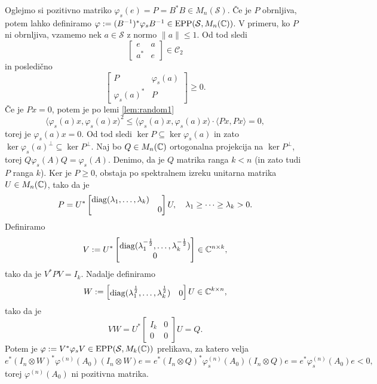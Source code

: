 \begin{dokaz}
    Oglejmo si pozitivno matriko $\varphi_s (e) = P = B^* B \in M_n (\mathcal{S})$. 
    Če je $P$ obrnljiva, potem lahko definiramo $\varphi := (B^{-1})^* \varphi_s B^{-1} \in \operatorname{EPP}(\mathcal{S}, M_n (\mathbb C))$.
    V primeru, ko $P$ ni obrnljiva, vzamemo nek $a \in \mathcal{S}$ z normo $\| a\| \leq 1$.
    Od tod sledi 
    $$\begin{bmatrix}
        e & a\\
        a ^* & e
    \end{bmatrix} \in \mathcal{C}_2$$
    in posledično 
    $$\begin{bmatrix}
        P & \varphi_s (a)\\
        \varphi_s (a) ^* & P
    \end{bmatrix}\geq 0.$$
    Če je $P x = 0$, potem je po lemi \ref{lem:random1} 
    $$\langle \varphi_s (a) x, \varphi_s (a) x \rangle ^2 \leq \langle \varphi_s (a) x, \varphi_s (a) x \rangle \cdot \langle P x, P x \rangle = 0,$$
    torej je $\varphi_s (a) x = 0$. Od tod sledi $ \ker P \subseteq \ker \varphi_s (a)$ in zato $ \ker \varphi_s (a) ^\perp \subseteq\ker P^\perp$.
    Naj bo $Q \in M_n (\mathbb C)$ ortogonalna projekcija na $\ker P^\perp$, torej $Q \varphi_s (A) Q = \varphi_s (A)$.
    Denimo, da je $Q$ matrika ranga $k < n$ (in zato tudi $P$ ranga $k$). Ker je $P \geq 0$, obstaja po spektralnem izreku 
    unitarna matrika $U \in M_n (\mathbb C)$, tako da je 
    $$P = U^* \begin{bmatrix}
        \operatorname{diag} (\lambda_1, \dots, \lambda_k) &\\
        & 0
    \end{bmatrix} U,\quad \lambda_1 \geq \cdots \geq \lambda_k > 0.$$
    Definiramo 
    $$V := U^* \begin{bmatrix}
        \operatorname{diag} (\lambda_1 ^{-\frac{1}{2}}, \dots, \lambda_k ^{-\frac{1}{2}})\\ 
        0
    \end{bmatrix} \in \mathbb C^{n \times k},$$
    tako da je $V^* P V = I_k$. Nadalje definiramo 
    $$W := \begin{bmatrix}
        \operatorname{diag} (\lambda_1 ^{\frac{1}{2}}, \dots, \lambda_k ^{\frac{1}{2}}) & 0
    \end{bmatrix} U \in \mathbb C^{k \times n},$$
    tako da je 
    $$V W = U^* \begin{bmatrix}
        I_k & 0\\ 
        0 & 0
    \end{bmatrix} U = Q.$$
    Potem je $\varphi := V^* \varphi_s V \in \operatorname{EPP} (\mathcal{S}, M_k (\mathbb C))$ prelikava, za katero velja
    $$e^* (I_n \otimes W)^* \varphi^{(n)} (A_0) (I_n \otimes W) e = e^* (I_n \otimes Q)^* \varphi_s ^{(n)} (A_0) (I_n \otimes Q) e =e^* \varphi_s ^{(n)} (A_0) e < 0,$$
    torej $\varphi^{(n)} (A_0)$ ni pozitivna matrika.
\end{dokaz}

